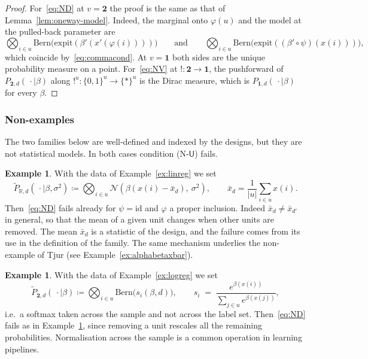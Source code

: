 \documentclass[11pt,a4paper]{article}
\theoremstyle{plain}
\theoremstyle{definition}
\newtheorem{example}[theorem]{Example}
\theoremstyle{remark}
\newcommand{\cat}[1]{\mathsf{#1}}
\newcommand{\catU}{\cat{U}}
\newcommand{\id}{\mathrm{id}}
\newcommand{\R}{\mathbb{R}}
\newcommand{\Norm}{\mathcal{N}}
\newcommand{\Bern}{\mathrm{Bern}}
\newcommand{\expit}{\mathrm{expit}}
\begin{document}
\begin{proof}
For~\eqref{eq:ND} at $v=\mathbf{2}$ the proof is the same as that of
Lemma~\ref{lem:oneway-model}. Indeed, the marginal onto $\varphi(u)$ and the
model at the pulled-back parameter are
\[
\bigotimes_{i\in u}\Bern\bigl(\expit(\beta'(x'(\varphi(i))))\bigr)
\qquad\text{and}\qquad
\bigotimes_{i\in u}\Bern\bigl(\expit((\beta'\circ\psi)(x(i)))\bigr),
\]
which coincide by~\eqref{eq:commacond}. At $v=\mathbf{1}$ both sides are the
unique probability measure on a point. For~\eqref{eq:NV} at
$!\colon\mathbf{2}\to\mathbf{1}$, the pushforward of
$P_{\mathbf{2},d}(\,\cdot\mid\beta)$ along
$!^{u}\colon\{0,1\}^{u}\to\{*\}^{u}$ is the Dirac measure, which is
$P_{\mathbf{1},d}(\,\cdot\mid\beta)$ for every $\beta$.
\end{proof}

\subsubsection{Non-examples}

The two families below are well-defined and indexed by the designs, but they
are not statistical models. In both cases condition (N-$\catU$) fails.

\begin{example}\label{ex:centring}
With the data of Example~\ref{ex:linreg} we set
\[
\widetilde{P}_{\R,d}(\,\cdot\mid\beta,\sigma^{2})
\coloneqq \bigotimes_{i\in u}\Norm(\beta(x(i)-\bar{x}_{d}),\ \sigma^{2}),
\qquad
\bar{x}_{d} = \frac{1}{|u|}\sum_{i\in u} x(i).
\]
Then~\eqref{eq:ND} fails already for $\psi=\id$ and $\varphi$ a proper
inclusion. Indeed $\bar{x}_{d} \neq \bar{x}_{d'}$ in general, so that the mean
of a given unit changes when other units are removed. The mean $\bar{x}_{d}$ is
a statistic of the design, and the failure comes from its use in the definition
of the family. The same mechanism underlies the non-example of Tjur (see
Example~\ref{ex:alphabetaxbar}).
\end{example}

\begin{example}\label{ex:softmax}
With the data of Example~\ref{ex:logreg} we set
\[
\widetilde{P}_{\mathbf{2},d}(\,\cdot\mid\beta)
\coloneqq \bigotimes_{i\in u}\Bern\bigl(s_{i}(\beta,d)\bigr),
\qquad
s_{i} \;=\; \frac{e^{\beta(x(i))}}{\sum_{j\in u}e^{\beta(x(j))}},
\]
i.e.\ a softmax taken across the sample and not across the label set.
Then~\eqref{eq:ND} fails as in Example~\ref{ex:centring}, since removing a unit
rescales all the remaining probabilities. Normalisation across the sample is a
common operation in learning pipelines.
\end{example}
\end{document}
